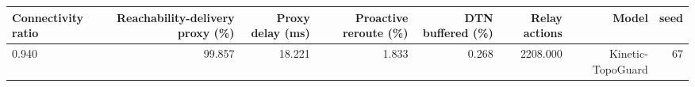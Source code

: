\begin{tabular}{lrrrrrrr}
\toprule
Connectivity ratio & Reachability-delivery proxy (\%) & Proxy delay (ms) & Proactive reroute (\%) & DTN buffered (\%) & Relay actions & Model & seed \\
\midrule
0.940 & 99.857 & 18.221 & 1.833 & 0.268 & 2208.000 & Kinetic-TopoGuard & 67 \\
\bottomrule
\end{tabular}